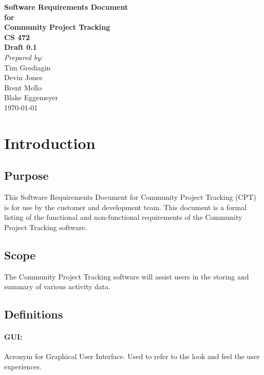 \documentclass[12pt]{article}
\begin{document}
\begin{titlepage}
\begin{flushright} 
{\LARGE \bfseries Software Requirements Document}\\[1.2cm]
{\large \bfseries for}\\[1.2cm]
{\huge \bfseries Community Project Tracking}\\[1.2cm]
{\large \bfseries CS 472}\\
\vfill
{\large \bfseries Draft 0.1}\\[2cm]
\emph{Prepared by:} \\
Tim Grediagin\\
Devin Jones\\
Brent Mello\\
Blake Eggemeyer \\ [3cm]
{\large \today}
\\[2cm]
\end{flushright}
\end{titlepage}
\setcounter{tocdepth}{3}
\setcounter{secnumdepth}{4}
\tableofcontents
\newpage
\section{Introduction}

\subsection{Purpose}
This Software Requirements Document for Community Project Tracking (CPT) is for use by the customer and development team. This document is a formal listing of the functional and non-functional requirements of the Community Project Tracking software.

\subsection{Scope}
The Community Project Tracking software will assist users in the storing and summary of various activity data.

\subsection{Definitions}

\paragraph{GUI:} Acronym for Graphical User Interface. Used to refer to the look and feel the user experiences.
\end{document}
